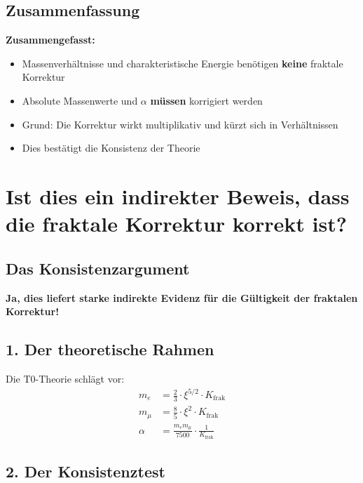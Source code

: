 \documentclass[12pt,a4paper]{article}
\theoremstyle{definition}
\begin{document}
\subsection{Zusammenfassung}

\begin{tcolorbox}[colback=blue!5!white,colframe=blue!75!black]
	\textbf{Zusammengefasst:}
	\begin{itemize}
		\item Massenverhältnisse und charakteristische Energie benötigen \textbf{keine} fraktale Korrektur
		\item Absolute Massenwerte und $\alpha$ \textbf{müssen} korrigiert werden
		\item Grund: Die Korrektur wirkt multiplikativ und kürzt sich in Verhältnissen
		\item Dies bestätigt die Konsistenz der Theorie
	\end{itemize}
\end{tcolorbox}

\section{Ist dies ein indirekter Beweis, dass die fraktale Korrektur korrekt ist?}

\subsection{Das Konsistenzargument}

\begin{tcolorbox}[colback=green!5!white,colframe=green!75!black]
	\textbf{Ja, dies liefert starke indirekte Evidenz für die Gültigkeit der fraktalen Korrektur!}
\end{tcolorbox}

\subsection{1. Der theoretische Rahmen}

Die T0-Theorie schlägt vor:
\begin{align*}
	m_e &= \frac{2}{3} \cdot \xi^{5/2} \cdot K_{\text{frak}} \\
	m_\mu &= \frac{8}{5} \cdot \xi^2 \cdot K_{\text{frak}} \\
	\alpha &= \frac{m_e m_\mu}{7500} \cdot \frac{1}{K_{\text{frak}}}
\end{align*}

\subsection{2. Der Konsistenztest}
\end{document}
